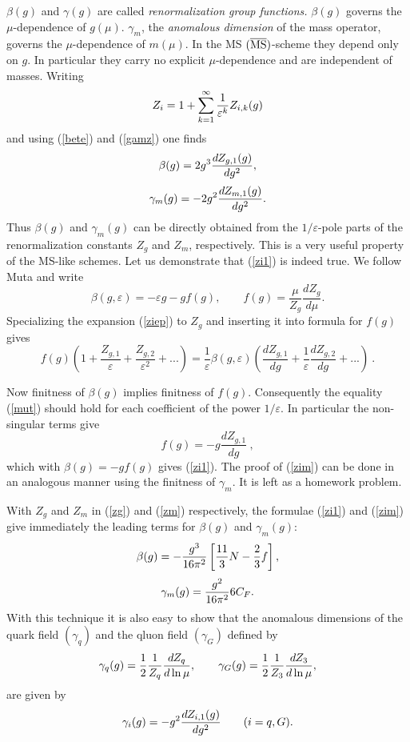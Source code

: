 \documentclass[12pt]{article}
\def\eps{\varepsilon}
\newcommand{\be}{\begin{equation}}
\newcommand{\ee}{\end{equation}}
\begin{document}
\begin{itemize}
$\beta(g)$ and $\gamma(g)$ are called {\it renormalization group functions.}
$\beta(g)$ governs the $\mu$-dependence of $g(\mu)$.
$\gamma_m$, the {\it anomalous dimension} of the mass operator, governs
the $\mu$-dependence of $m(\mu)$.
In the MS $(\overline{\rm MS})$-scheme they depend only on $g$. 
In particular they carry no explicit $\mu$-dependence and are independent of
masses.
Writing
\begin{equation}\label{ziep}
Z_i=1+\sum^\infty_{k=1} {1\over \eps^k} Z_{i, k}(g)  
\end{equation}
and
using (\ref{bete}) and (\ref{gamz}) one finds
\begin{equation}\label{zi1}
\beta(g)=2 g^3{d Z_{g, 1}(g)\over d g^2},
\ee
\be\label{zim}
\gamma_m(g)=-2 g^2{d Z_{m, 1}(g)\over d g^2}.
\end{equation}
Thus $\beta(g)$ and $\gamma_m(g)$ can be
directly obtained from the $1/\eps$-pole parts of the renormalization
constants $Z_g$ and $Z_m$, respectively. This is a very useful
property of the MS-like schemes. Let us demonstrate that (\ref{zi1})
is indeed true. 
We follow Muta \cite{MUTA} and write
\be
\beta(g, \eps)= -\eps g-g f(g),  
\quad\quad
f(g)=\frac{\mu}{Z_g}\frac{d Z_g}{d\mu}.
\end{equation}
Specializing the expansion (\ref{ziep}) to $Z_g$ and inserting
it into formula for $f(g)$ gives
\be\label{mut}
f(g)\left( 1 +\frac{Z_{g,1}}{\eps}+ \frac{Z_{g,2}}{\eps^2}+...\right)
=\frac{1}{\eps} \beta(g,\eps)
\left(\frac{dZ_{g,1}}{dg}+\frac{1}{\eps}\frac{dZ_{g,2}}{dg}+...\right)~.
\ee

Now finitness of $\beta(g)$ implies finitness of $f(g)$. Consequently
the equality (\ref{mut}) should hold for each coefficient of the
power $1/\eps$. In particular the non-singular terms give
\be
f(g)=-g \frac{dZ_{g,1}}{dg}~,
\ee
which with $\beta(g)=-gf(g)$ gives (\ref{zi1}).
The proof of (\ref{zim}) can be done in an analogous
manner using the finitness of $\gamma_m$. It is left as 
a homework problem.

With $Z_g$ and $Z_m$ in (\ref{zg}) and (\ref{zm}) respectively,
the formulae (\ref{zi1}) and (\ref{zim}) give
 immediately the leading terms for $\beta(g)$ and $\gamma_m(g)$:
\be
\beta(g)= -{g^3\over 16\pi^2}\left[\frac{11}{3}N-\frac{2}{3}f \right],
\ee
\be
\gamma_m(g)={g^2\over 16\pi^2} 6 C_F.
\ee
With this technique it is also easy to show that the anomalous
dimensions of the quark field $(\gamma_q)$ and the qluon field
$(\gamma_G)$ defined by
\be
\gamma_q(g)=\frac{1}{2}{1\over Z_q}{d Z_q\over d\ln\mu},\quad\quad
\gamma_G(g)=\frac{1}{2}{1\over Z_3}{d Z_3\over d\ln\mu},
  \end{equation}
are given by
\be
\gamma_i(g)=- g^2{d Z_{i, 1}(g)\over d g^2} \quad\quad (i=q,G).
\end{equation}


\end{itemize}
\end{document}
